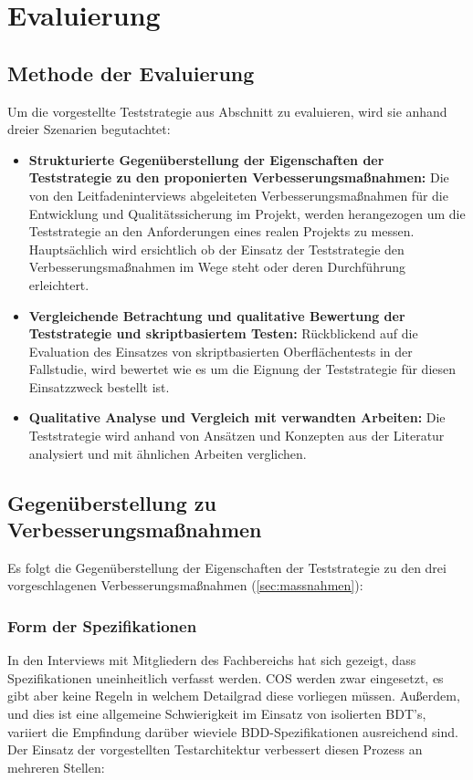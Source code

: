 \chapter{Evaluierung}
\label{sec:mbt_bdt}
\section{Methode der Evaluierung}
Um die vorgestellte Teststrategie aus Abschnitt \label{sec:mbt_bdt_concept} zu evaluieren, wird sie anhand dreier Szenarien begutachtet: 

\begin{itemize}
\item \textbf{Strukturierte Gegenüberstellung der Eigenschaften der Teststrategie zu den proponierten Verbesserungsmaßnahmen:} Die von den Leitfadeninterviews abgeleiteten Verbesserungsmaßnahmen für die Entwicklung und Qualitätssicherung im Projekt, werden herangezogen um die Teststrategie an den Anforderungen eines realen Projekts zu messen. Hauptsächlich wird ersichtlich ob der Einsatz der Teststrategie den Verbesserungsmaßnahmen im Wege steht oder deren Durchführung erleichtert.
\item \textbf{Vergleichende Betrachtung und qualitative Bewertung der Teststrategie und skriptbasiertem Testen:} Rückblickend auf die Evaluation des Einsatzes von skriptbasierten Oberflächentests in der Fallstudie, wird bewertet wie es um die Eignung der Teststrategie für diesen Einsatzzweck bestellt ist.
\item \textbf{Qualitative Analyse und Vergleich mit verwandten Arbeiten:} Die Teststrategie wird anhand von Ansätzen und Konzepten aus der Literatur analysiert und mit ähnlichen Arbeiten verglichen. 
\end{itemize}

\section{Gegenüberstellung zu Verbesserungsmaßnahmen}
Es folgt die Gegenüberstellung der Eigenschaften der Teststrategie zu den drei vorgeschlagenen Verbesserungsmaßnahmen (\ref{sec:massnahmen}):

\subsection{Form der Spezifikationen}
In den Interviews mit Mitgliedern des Fachbereichs hat sich gezeigt, dass Spezifikationen uneinheitlich verfasst werden. \Gls{COS} werden zwar eingesetzt, es gibt aber keine Regeln in welchem Detailgrad diese vorliegen müssen. Außerdem, und dies ist eine allgemeine Schwierigkeit im Einsatz von isolierten \Gls{BDT}'s, variiert die Empfindung darüber wieviele \Gls{BDD}-Spezifikationen ausreichend sind.\\ Der Einsatz der vorgestellten Testarchitektur verbessert diesen Prozess an mehreren Stellen:

